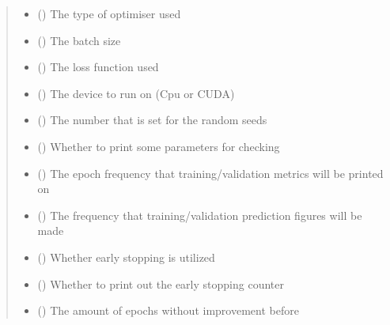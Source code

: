 \documentclass[letterpaper,10pt,english]{sphinxmanual}
\begin{document}
\begin{fulllineitems}
\begin{quote}
\begin{description}
\begin{itemize}
\item {} 
 () \textendash{} The type of optimiser used

\item {} 
 () \textendash{} The batch size

\item {} 
 () \textendash{} The loss function used

\item {} 
 () \textendash{} The device to run on (Cpu or CUDA)

\item {} 
 () \textendash{} The number that is set for the random seeds

\item {} 
 () \textendash{} Whether to print some parameters for checking

\item {} 
 () \textendash{} The epoch frequency that training/validation
metrics will be printed on

\item {} 
 () \textendash{} The frequency that training/validation prediction
figures will be made

\item {} 
 () \textendash{} Whether early stopping is utilized

\item {} 
 () \textendash{} Whether to print out the early stopping counter

\item {} 
 () \textendash{} The amount of epochs without improvement before


\end{itemize}
\end{description}
\end{quote}
\end{fulllineitems}
\end{document}
